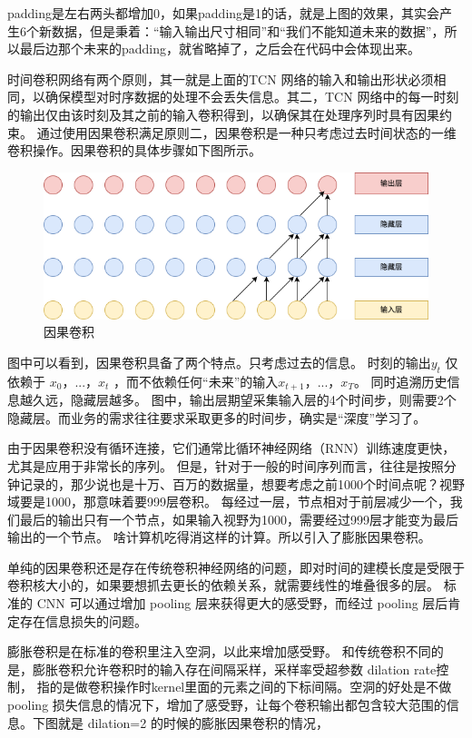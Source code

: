 padding是左右两头都增加0，如果padding是1的话，就是上图的效果，其实会产生6个新数据，但是秉着：“输入输出尺寸相同”和“我们不能知道未来的数据”，所以最后边那个未来的padding，就省略掉了，之后会在代码中会体现出来。

时间卷积网络有两个原则，其一就是上面的TCN 网络的输入和输出形状必须相同，以确保模型对时序数据的处理不会丢失信息。其二，TCN 网络中的每一时刻的输出仅由该时刻及其之前的输入卷积得到，以确保其在处理序列时具有因果约束。
通过使用因果卷积满足原则二，因果卷积是一种只考虑过去时间状态的一维卷积操作。因果卷积的具体步骤如下图所示。

\begin{figure}[htbp]
  \centering
  \includegraphics[width=\textwidth]{figures/causal_convolution.drawio.png}
  \caption{因果卷积}
\end{figure}

图中可以看到，因果卷积具备了两个特点。只考虑过去的信息。 时刻的输出$y_t$ 仅依赖于 $x_0，...，x_t$ ，而不依赖任何“未来”的输入$x_{t+1}，...，x_T$。
同时追溯历史信息越久远，隐藏层越多。 图中，输出层期望采集输入层的4个时间步，则需要2个隐藏层。而业务的需求往往要求采取更多的时间步，确实是“深度”学习了。

由于因果卷积没有循环连接，它们通常比循环神经网络（RNN）训练速度更快，尤其是应用于非常长的序列。
但是，针对于一般的时间序列而言，往往是按照分钟记录的，那少说也是十万、百万的数据量，想要考虑之前1000个时间点呢？视野域要是1000，那意味着要999层卷积。
每经过一层，节点相对于前层减少一个，我们最后的输出只有一个节点，如果输入视野为1000，需要经过999层才能变为最后输出的一个节点。
啥计算机吃得消这样的计算。所以引入了膨胀因果卷积。

单纯的因果卷积还是存在传统卷积神经网络的问题，即对时间的建模长度是受限于卷积核大小的，如果要想抓去更长的依赖关系，就需要线性的堆叠很多的层。
标准的 CNN 可以通过增加 pooling 层来获得更大的感受野，而经过 pooling 层后肯定存在信息损失的问题。

膨胀卷积是在标准的卷积里注入空洞，以此来增加感受野。
和传统卷积不同的是，膨胀卷积允许卷积时的输入存在间隔采样，采样率受超参数 dilation rate控制，
指的是做卷积操作时kernel里面的元素之间的下标间隔。空洞的好处是不做 pooling 损失信息的情况下，增加了感受野，让每个卷积输出都包含较大范围的信息。下图就是 dilation=2 的时候的膨胀因果卷积的情况，

